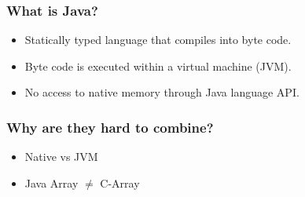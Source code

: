 \documentclass[%
]{beamer}
\begin{document}
\begin{frame}
    \frametitle{What is Java?}
    \begin{itemize}
          \item<1-> Statically typed language that compiles into byte code.
          \item<2-> Byte code is executed within a virtual machine (JVM).
          \item<3-> No access to native memory through Java language API.
    \end{itemize}
\end{frame}

\begin{frame}
    \frametitle{Why are they hard to combine?}
    \begin{itemize}
          \item Native vs JVM
          \item Java Array $\neq$ C-Array
    \end{itemize}
\end{frame}
\end{document}

